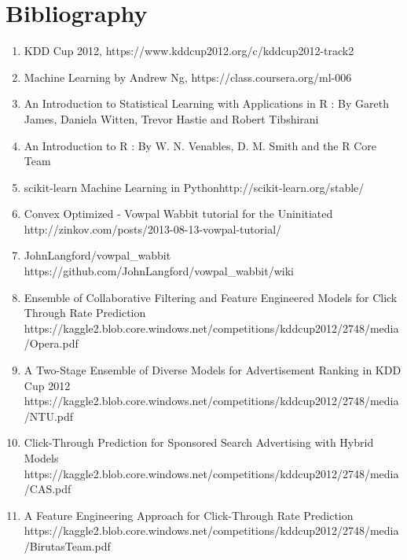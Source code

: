 \documentclass[10pt]{article}
\begin{document}
\section{Bibliography}
\begin{enumerate}
	\item KDD Cup 2012, https://www.kddcup2012.org/c/kddcup2012-track2
	\item Machine Learning by Andrew Ng, https://class.coursera.org/ml-006
	\item An Introduction to Statistical Learning with Applications in R : By Gareth James, Daniela Witten, Trevor Hastie and Robert Tibshirani
	\item An Introduction to R : By W. N. Venables, D. M. Smith and the R Core Team
	\item scikit-learn Machine Learning in Pythonhttp://scikit-learn.org/stable/
	\item Convex Optimized - Vowpal Wabbit tutorial for the Uninitiated http://zinkov.com/posts/2013-08-13-vowpal-tutorial/
	\item JohnLangford/vowpal\_wabbit https://github.com/JohnLangford/vowpal\_wabbit/wiki
	\item Ensemble of Collaborative Filtering and Feature Engineered Models for Click Through Rate Prediction https://kaggle2.blob.core.windows.net/competitions/kddcup2012/2748/media/Opera.pdf
	\item A Two-Stage Ensemble of Diverse Models for Advertisement Ranking in KDD Cup 2012 https://kaggle2.blob.core.windows.net/competitions/kddcup2012/2748/media/NTU.pdf
	\item Click-Through Prediction for Sponsored Search Advertising with Hybrid Models https://kaggle2.blob.core.windows.net/competitions/kddcup2012/2748/media/CAS.pdf
	\item A Feature Engineering Approach for Click-Through Rate Prediction https://kaggle2.blob.core.windows.net/competitions/kddcup2012/2748/media/BirutasTeam.pdf
\end{enumerate}
	

\nocite{*}		

		
\end{document}
